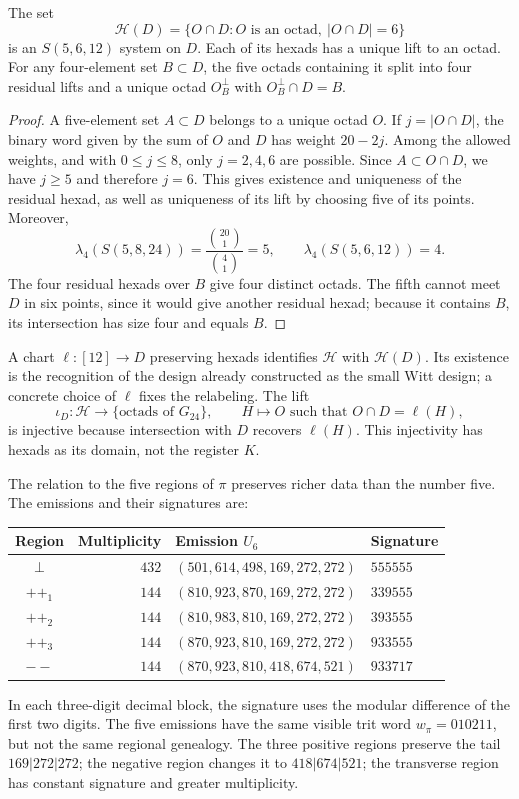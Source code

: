 \begin{proposition}
\label{exc:residuo-binario}
The set
\[
 \mathcal H(D)=
 \{O\cap D: O\text{ is an octad},\ |O\cap D|=6\}
\]
is an $S(5,6,12)$ system on $D$. Each of its hexads has
a unique lift to an octad. For any four-element set $B\subset D$,
the five octads containing it split into four residual
lifts and a unique octad $O_B^\perp$ with $O_B^\perp\cap D=B$.
\end{proposition}

\begin{proof}
A five-element set $A\subset D$ belongs to a unique octad $O$. If
$j=|O\cap D|$, the binary word given by the sum of $O$ and $D$ has weight
$20-2j$. Among the allowed weights, and with $0\leq j\leq8$, only
$j=2,4,6$ are possible. Since $A\subset O\cap D$, we have $j\geq5$
and therefore $j=6$. This gives existence and uniqueness of the residual
hexad, as well as uniqueness of its lift by choosing five of its
points. Moreover,
\[
 \lambda_4(S(5,8,24))=\frac{\binom{20}1}{\binom41}=5,
 \qquad
 \lambda_4(S(5,6,12))=4.
\]
The four residual hexads over $B$ give four distinct octads.
The fifth cannot meet $D$ in six points, since it would give another residual
hexad; because it contains $B$, its intersection has size four and
equals $B$.
\end{proof}

A chart $\ell:[12]\to D$ preserving hexads identifies
$\mathcal H$ with $\mathcal H(D)$. Its existence is the recognition
of the design already constructed as the small Witt design; a concrete
choice of $\ell$ fixes the relabeling. The lift
\[
 \iota_D:\mathcal H\longrightarrow
       \{\text{octads of }G_{24}\},
 \qquad H\longmapsto O\text{ such that }O\cap D=\ell(H),
\]
is injective because intersection with $D$ recovers $\ell(H)$.
This injectivity has hexads as its domain, not the register $K$.

The relation to the five regions of $\pi$ preserves richer data
than the number five. The emissions and their signatures are:
\begin{center}
\small
\begin{tabular}{@{}crll@{}}
\toprule
Region & Multiplicity & Emission $U_6$ & Signature \\
\midrule
$\perp$ & $432$ & $(501,614,498,169,272,272)$ & $555555$ \\
$++_1$ & $144$ & $(810,923,870,169,272,272)$ & $339555$ \\
$++_2$ & $144$ & $(810,983,810,169,272,272)$ & $393555$ \\
$++_3$ & $144$ & $(870,923,810,169,272,272)$ & $933555$ \\
$--$ & $144$ & $(870,923,810,418,674,521)$ & $933717$ \\
\bottomrule
\end{tabular}
\end{center}
In each three-digit decimal block, the signature uses the modular
difference of the first two digits. The five emissions have the
same visible trit word $w_\pi=010211$, but not the same
regional genealogy. The three positive regions preserve the tail
$169|272|272$; the negative region changes it to $418|674|521$;
the transverse region has constant signature and greater multiplicity.

